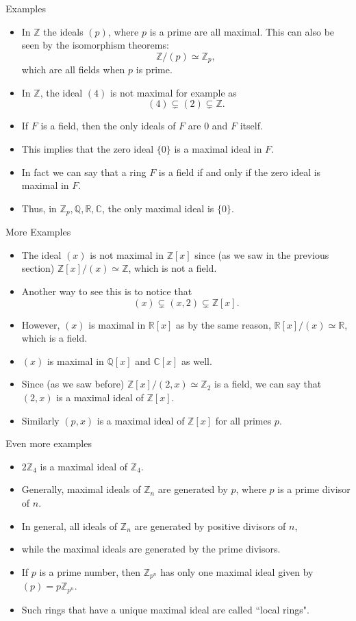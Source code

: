 \documentclass[ %
 10pt, xcolor={dvipsnames,svgnames,x11names,hyperref},
   hyperref={colorlinks=true,citecolor=green,linkcolor=DarkRed,urlcolor=ProcessBlue,anchorcolor=blue}
  ]{beamer}
\newenvironment{stepitemize}{\begin{itemize}[<+->]}{\end{itemize} }
\newcommand{\Z}{\mathbb{Z}}
\newcommand{\Q}{\mathbb{Q}}
\newcommand{\R}{\mathbb{R}}
\newcommand{\C}{\mathbb{C}}
\begin{document}
\begin{frame}{Examples}
\begin{stepitemize}
    \item In $\Z$ the ideals $(p)$, where $p$ is a prime are all maximal. This can also be seen by the isomorphism theorems: 
    $$\Z/(p)\simeq \Z_p,$$
    which are all fields when $p$ is prime. 
    \item In $\Z$, the ideal $(4)$ is not maximal for example as 
    $$(4) \subsetneq (2) \subsetneq \Z.$$
    \item If $F$ is a field, then the only ideals of $F$ are $0$ and $F$ itself. 
    \item This implies that the zero ideal $\{0\}$ is a maximal ideal in $F$. 
    \item In fact we can say that a ring $F$ is a field if and only if the zero ideal is maximal in $F$. 
    \item Thus, in $\Z_p, \Q, \R, \C$, the only maximal ideal is $\{0\}$.
\end{stepitemize}
\end{frame}
\begin{frame}{More Examples}
\begin{stepitemize}
    \item The ideal $(x)$ is not maximal in $\Z[x]$ since (as we saw in the previous section) $\Z[x]/(x)\simeq \Z$, which is not a field. 
    \item Another way to see this is to notice that 
    $$(x) \subsetneq (x,2) \subsetneq \Z[x].$$
    \item However, $(x)$ is maximal in $\R[x]$ as by the same reason, $\R[x]/(x)\simeq \R$, which is a field. 
    \item $(x)$ is maximal in $\Q[x]$ and $\C[x]$ as well.  
    \item Since (as we saw before) $\Z[x]/(2,x) \simeq \Z_2$ is a field, we can say that $(2,x)$ is a maximal ideal of $\Z[x]$. 
    \item Similarly $(p,x)$ is a maximal ideal of $\Z[x]$ for all primes $p$. 
\end{stepitemize}
\end{frame}

\begin{frame}{Even more examples}
\begin{stepitemize}
        \item $2\Z_4$ is a maximal ideal of $\Z_4$. 
        \item Generally, maximal ideals of $\Z_n$ are generated by $p$, where $p$ is a prime divisor of $n$. 
        \item In general, all ideals of $\Z_n$ are generated by positive divisors of $n$, 
        \item while the maximal ideals are generated by the prime divisors. 
    \item If $p$ is a prime number, then $\Z_{p^n}$ has only one maximal ideal given by $(p) = p\Z_{p^n}$. 
    \item Such rings that have a unique maximal ideal are called ``local rings".
\end{stepitemize}
\end{frame}
\end{document}
